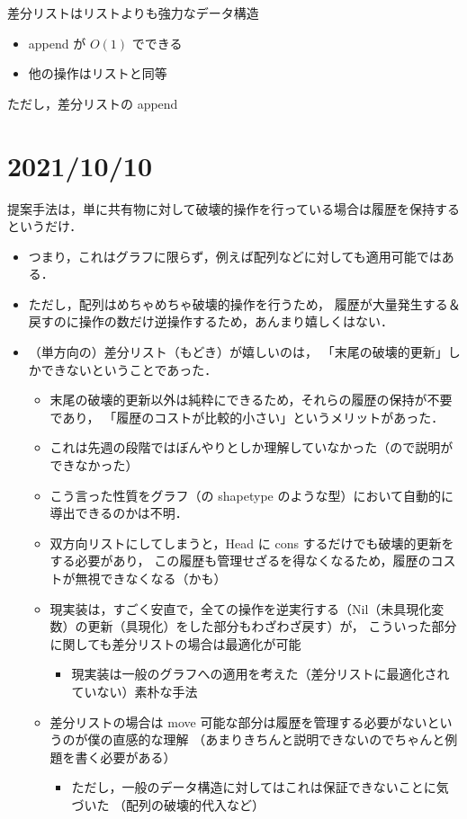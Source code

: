 \documentclass[10pt, a4j, twocolumn]{scrartcl}
\begin{document}
差分リストはリストよりも強力なデータ構造
\begin{itemize}
\item append が \(O(1)\) でできる
\item 他の操作はリストと同等
\end{itemize}


ただし，差分リストの append


\section{2021/10/10}
\label{sec:org07a6292}

提案手法は，単に共有物に対して破壊的操作を行っている場合は履歴を保持するというだけ．
\begin{itemize}
\item つまり，これはグラフに限らず，例えば配列などに対しても適用可能ではある．
\item ただし，配列はめちゃめちゃ破壊的操作を行うため，
履歴が大量発生する＆戻すのに操作の数だけ逆操作するため，あんまり嬉しくはない．
\item （単方向の）差分リスト（もどき）が嬉しいのは，
「末尾の破壊的更新」しかできないということであった．
\begin{itemize}
\item 末尾の破壊的更新以外は純粋にできるため，それらの履歴の保持が不要であり，
「履歴のコストが比較的小さい」というメリットがあった．
\item これは先週の段階ではぼんやりとしか理解していなかった（ので説明ができなかった）
\item こう言った性質をグラフ（の shapetype のような型）において自動的に導出できるのかは不明．
\item 双方向リストにしてしまうと，Head に cons するだけでも破壊的更新をする必要があり，
この履歴も管理せざるを得なくなるため，履歴のコストが無視できなくなる（かも）
\item 現実装は，すごく安直で，全ての操作を逆実行する（Nil（未具現化変数）の更新（具現化）をした部分もわざわざ戻す）が，
こういった部分に関しても差分リストの場合は最適化が可能
\begin{itemize}
\item 現実装は一般のグラフへの適用を考えた（差分リストに最適化されていない）素朴な手法
\end{itemize}
\item 差分リストの場合は move 可能な部分は履歴を管理する必要がないというのが僕の直感的な理解
（あまりきちんと説明できないのでちゃんと例題を書く必要がある）
\begin{itemize}
\item ただし，一般のデータ構造に対してはこれは保証できないことに気づいた
（配列の破壊的代入など）
\end{itemize}
\end{itemize}
\end{itemize}
\end{document}

